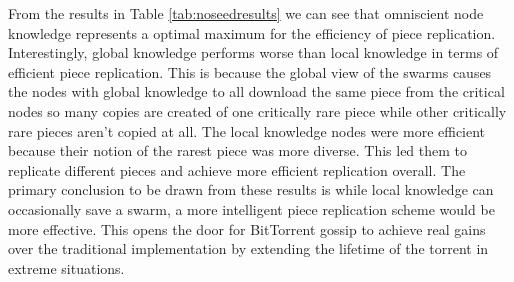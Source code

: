 From the results in Table \ref{tab:noseedresults} we can see that omniscient node knowledge
represents a optimal maximum for the efficiency of piece
replication. Interestingly, global knowledge performs worse than local
knowledge in terms of efficient piece replication. This is because the
global view of the swarms causes the nodes with global knowledge to all
download the same piece from the critical nodes so many copies are
created of one critically rare piece while other critically rare
pieces aren't copied at all. The local knowledge nodes were 
more efficient because their notion of the rarest piece was more
diverse. This led them to replicate different pieces and achieve more
efficient replication overall. The primary conclusion to be drawn from
these results is while local knowledge can
occasionally save a swarm, a more intelligent piece replication scheme
would be more effective. This opens the door for BitTorrent gossip to
achieve real gains over the traditional implementation by extending
the lifetime of the torrent in extreme situations.
